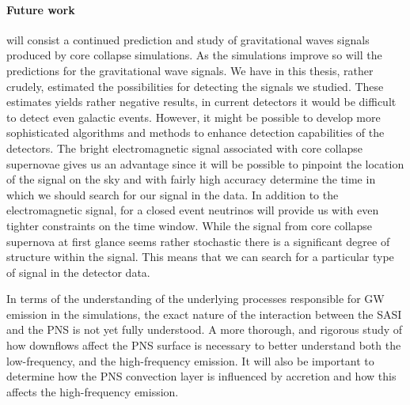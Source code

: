 \paragraph{Future work} will consist a continued prediction and study of gravitational waves signals produced by core collapse simulations. 
As the simulations improve so will the predictions for the gravitational wave signals. 
We have in this thesis, rather crudely, estimated the possibilities for detecting the signals we studied. 
These estimates yields rather negative results, in current detectors it would be difficult to detect even galactic events. 
However, it might be possible to develop more sophisticated algorithms and methods to enhance detection capabilities of the detectors. 
The bright electromagnetic signal associated with core collapse supernovae gives us an advantage since it will be possible 
to pinpoint the location of the signal on the sky and with fairly high accuracy determine the time in which we 
should search for our signal in the data. In addition to the electromagnetic signal, 
for a closed event neutrinos will provide us with even tighter constraints on the time window. 
While the signal from core collapse supernova at first glance seems rather stochastic there is 
a significant degree of structure within the signal. This means that we can 
search for a particular type of signal in the detector data. 

In terms of the understanding of the underlying processes responsible for GW emission in the simulations, the exact nature
of the interaction between the SASI and the PNS is not yet fully understood. A more thorough, and rigorous study of
how downflows affect the PNS surface is necessary to better understand both the low-frequency, and the high-frequency emission.
It will also be important to determine how the PNS convection layer is influenced by accretion and how this affects
the high-frequency emission.